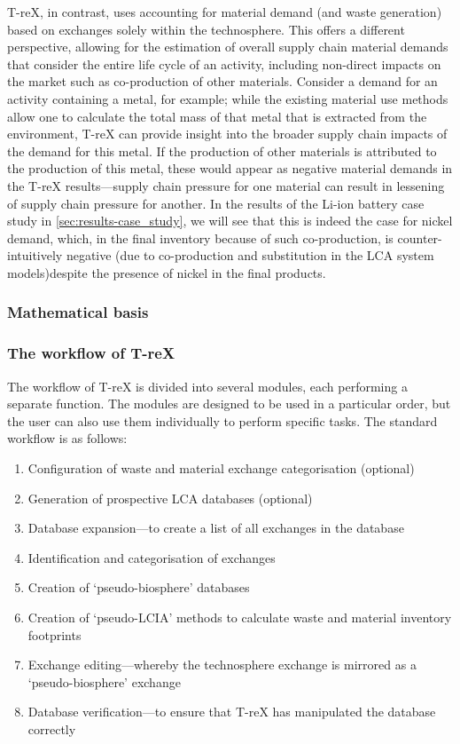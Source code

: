 T-reX, in contrast, uses accounting for material demand (and waste generation) based on exchanges solely within the technosphere. This offers a different perspective, allowing for the estimation of overall supply chain material demands that consider the entire life cycle of an activity, including non-direct impacts on the market such as co-production of other materials. Consider a demand for an activity containing a metal, for example; while the existing material use methods allow one to calculate the total mass of that metal that is extracted from the environment, T-reX can provide insight into the broader supply chain impacts of the demand for this metal. If the production of other materials is attributed to the production of this metal, these would appear as negative material demands in the T-reX results---supply chain pressure for one material can result in lessening of supply chain pressure for another. In the results of the Li-ion battery case study in \autoref{sec:results-case_study}, we will see that this is indeed the case for nickel demand, which, in the final inventory because of such co-production, is counter-intuitively negative (due to co-production and substitution in the LCA system models)despite the presence of nickel in the final products.

\subsubsection{Mathematical basis}


\subsubsection{The workflow of T-reX}

The workflow of T-reX is divided into several modules, each performing a separate function. The modules are designed to be used in a particular order, but the user can also use them individually to perform specific tasks. The standard workflow is as follows:

\begin{enumerate}
    \item Configuration of waste and material exchange categorisation (optional)
    \item Generation of prospective LCA databases (optional)
    \item Database expansion---to create a list of all exchanges in the database
    \item Identification and categorisation of exchanges
    \item Creation of `pseudo-biosphere' databases
    \item Creation of `pseudo-LCIA' methods to calculate waste and material inventory footprints
    \item Exchange editing---whereby the technosphere exchange is mirrored as a `pseudo-biosphere' exchange
    \item Database verification---to ensure that T-reX has manipulated the database correctly
\end{enumerate}

